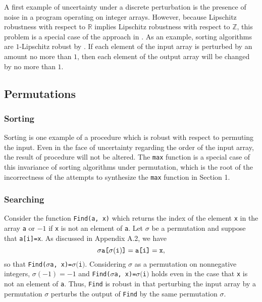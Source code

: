 \documentclass{llncs}
\DeclareMathOperator{\Perm}{Perm}
\DeclareMathOperator{\len}{length}
\begin{document}
  A first example of uncertainty under a discrete perturbation is the presence
  of noise in a program operating on integer arrays.  However, because Lipschitz
  robustness with respect to \(\mathbb{R}\) implies Lipschitz robustness with
  respect to \(\mathbb{Z}\), this problem is a special case of the approach in
  \cite{chaudhuri10,chaudhuri11}.  As an example, sorting algorithms are
  \(1\)-Lipschitz robust by \cite{chaudhuri10,chaudhuri11}.
  If each element of the input array is perturbed by an amount
  no more than \(1\), then each element of the output array will be changed by no
  more than \(1\).

  \subsection{Permutations}


    \subsubsection{Sorting}

      Sorting is one example of a procedure which is robust with respect to permuting
      the input.  Even in the face of uncertainty regarding the order of the input
      array, the result of procedure will not be altered.  The \verb!max! function is
      a special case of this invariance of sorting algorithms under permutation, which
      is the root of the incorrectness of the attempts to synthesize the \verb!max!
      function in Section 1.

    \vspace{-0.2in}
    \subsubsection{Searching}

      Consider the function \verb!Find(a, x)! which returns the index of the element
      \verb!x! in the array \verb!a! or \(-1\) if \verb!x! is not an element of
      \verb!a!.  Let \(\sigma\) be a permutation and suppose that \verb!a[i]=x!.
      As discussed in Appendix A.2, we have
      \[
        \sigma\verb!a[!\sigma(\verb!i!)\verb!]! = \verb!a[i]! = \verb!x!,
      \] 
      so that \verb!Find(!\(\sigma\)\verb!a, x)=!\(\sigma(\)\verb!i!\()\).
      Considering \(\sigma\) as a permutation on nonnegative integers, \(\sigma(-1) =
      -1\) and \verb!Find(!\(\sigma\)\verb!a, x)=!\(\sigma(\)\verb!i!\()\) holds even
      in the case that \verb!x! is not an element of \verb!a!.  Thus, \verb!Find! is
      robust in that perturbing the input array by a permutation \(\sigma\) perturbs
      the output of \verb!Find! by the same permutation \(\sigma\).
\end{document}
